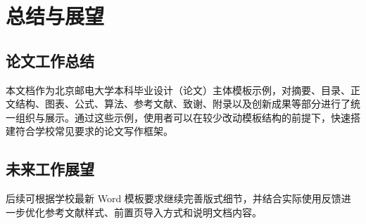 \chapter{总结与展望}

\section{论文工作总结}

本文档作为北京邮电大学本科毕业设计（论文）主体模板示例，对摘要、目录、正文结构、图表、公式、算法、参考文献、致谢、附录以及创新成果等部分进行了统一组织与展示。通过这些示例，使用者可以在较少改动模板结构的前提下，快速搭建符合学校常见要求的论文写作框架。

\section{未来工作展望}

后续可根据学校最新 Word 模板要求继续完善版式细节，并结合实际使用反馈进一步优化参考文献样式、前置页导入方式和说明文档内容。
